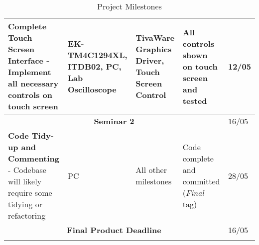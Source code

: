 \documentclass[12pt]{report}
\begin{document}
\begin{longtable}{|p{5cm}|p{4cm}|p{2.8cm}|p{2.5cm}|p{1.8cm}|}
	\hline
	\textbf{Complete Touch Screen Interface} - Implement all necessary controls on touch screen &
	EK-TM4C1294XL, ITDB02, PC, Lab Oscilloscope &
	TivaWare Graphics Driver, Touch Screen Control &
	All controls shown on touch screen and tested &
	12/05\\
	
	\hline
	\multicolumn{4}{|c|}{\textbf{Seminar 2}} & 16/05\\
	
	\hline
	\textbf{Code Tidy-up and Commenting} - Codebase will likely require some tidying or refactoring &
	PC &
	All other milestones &
	Code complete and committed (\emph{Final} tag) &
	28/05\\
	
	\hline
	\multicolumn{4}{|c|}{\textbf{Final Product Deadline}} & 16/05\\
	
	\hline
	
	\caption{Project Milestones}
	\label{milestones}
\end{longtable}



\end{document}
